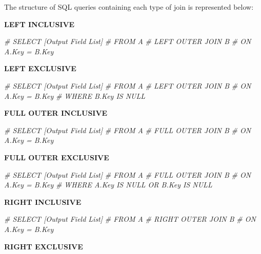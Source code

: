 \documentclass[
]{book}
\newenvironment{Shaded}{\begin{snugshade}}{\end{snugshade}}
\newcommand{\CommentTok}[1]{\textcolor[rgb]{0.56,0.35,0.01}{\textit{#1}}}
\begin{document}
The structure of SQL queries containing each type of join is represented below:

\textbf{LEFT INCLUSIVE}

\begin{Shaded}
\begin{Highlighting}[]
\CommentTok{\#  SELECT [Output Field List]}
\CommentTok{\#  FROM A }
\CommentTok{\#  LEFT OUTER JOIN B}
\CommentTok{\#  ON A.Key = B.Key}
\end{Highlighting}
\end{Shaded}

\textbf{LEFT EXCLUSIVE}

\begin{Shaded}
\begin{Highlighting}[]
\CommentTok{\#  SELECT [Output Field List]}
\CommentTok{\#  FROM A }
\CommentTok{\#  LEFT OUTER JOIN B}
\CommentTok{\#  ON A.Key = B.Key}
\CommentTok{\#  WHERE B.Key IS NULL}
\end{Highlighting}
\end{Shaded}

\textbf{FULL OUTER INCLUSIVE}

\begin{Shaded}
\begin{Highlighting}[]
\CommentTok{\#  SELECT [Output Field List]}
\CommentTok{\#  FROM A }
\CommentTok{\#  FULL OUTER JOIN B}
\CommentTok{\#  ON A.Key = B.Key}
\end{Highlighting}
\end{Shaded}

\textbf{FULL OUTER EXCLUSIVE}

\begin{Shaded}
\begin{Highlighting}[]
\CommentTok{\#  SELECT [Output Field List]}
\CommentTok{\#  FROM A }
\CommentTok{\#  FULL OUTER JOIN B}
\CommentTok{\#  ON A.Key = B.Key}
\CommentTok{\#  WHERE A.Key IS NULL OR B.Key IS NULL  }
\end{Highlighting}
\end{Shaded}

\textbf{RIGHT INCLUSIVE}

\begin{Shaded}
\begin{Highlighting}[]
\CommentTok{\#  SELECT [Output Field List]}
\CommentTok{\#  FROM A }
\CommentTok{\#  RIGHT OUTER JOIN B}
\CommentTok{\#  ON A.Key = B.Key}
\end{Highlighting}
\end{Shaded}

\textbf{RIGHT EXCLUSIVE}
\end{document}

